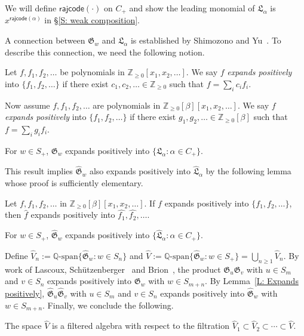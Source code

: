 \documentclass[ALCO]{cedram}
\newcommand{\fG}{\mathfrak{G}}
\newcommand{\fGb}{\fG}
\newcommand{\fL}{\mathfrak{L}}
\newcommand{\fLb}{\fL}
\newcommand{\topLas}{\widehat{\fL}}
\newcommand{\topGro}{\widehat{\fG}}
\newcommand{\Q}{\mathbb{Q}}
\newcommand{\rajcode}{\mathsf{rajcode}}
\newcommand{\definition}[1]{{\color{darkred}\emph{#1}}}
\begin{document}
We will define $\rajcode(\cdot)$ on $C_+$
and show the leading monomial of $\fLb_\alpha$ is $x^{\rajcode(\alpha)}$
in \S\ref{S: weak composition}.

A connection between $\fGb_w$ and $\fLb_\alpha$
is established by Shimozono and Yu~\cite{SY}.
To describe this connection, 
we need the following notion.
\begin{defn}
Let $f, f_1, f_2, \dots$ be polynomials in 
$\mathbb{Z}_{\geq 0}[x_1, x_2,\dots]$.
We say $f$ \definition{expands positively} 
into $\{f_1,f_2, \dots\}$ if there exist 
$c_1,c_2, \dots \in \mathbb{Z}_{\geq 0}$
such that $f = \sum_{i} c_if_i$.

Now assume $f, f_1, f_2, \dots$ are polynomials 
in $\mathbb{Z}_{ \geq 0}[\beta][x_1, x_2,\dots]$.
We say $f$ \definition{expands positively} 
into $\{f_1,f_2, \dots\}$ if there exist 
$g_1,g_2, \dots \in \mathbb{Z}_{\geq 0}[\beta]$ 
such that $f = \sum_{i} g_if_i$.
\end{defn}

\begin{ourthm}[\cite{SY}]
\label{T: Gro to Las}
For $w \in S_+$, $\fGb_w$ expands positively
into $\{\fLb_\alpha: \alpha \in C_+\}$. 
\end{ourthm}
 
This result implies
$\topGro_w$ also expands
positively into
$\topLas_\alpha$ by the following lemma whose proof
is sufficiently elementary. 

\begin{lemma}
\label{L: Expands positively}
Let $f, f_1, f_2, \dots$ 
in $\mathbb{Z}_{\geq 0}[\beta][x_1, x_2,\dots]$.
If $f$ expands positively 
into $\{f_1, f_2, \dots\}$,
then $\widehat{f}$ expands positively into $\widehat{f_1}, \widehat{f_2}, \dots $.
\end{lemma}

\begin{cor}
\label{C: top Gro to top Las}
For $w \in S_+$,
$\topGro_w$ expands positively into $\{\topLas_\alpha: \alpha \in C_+\}$.
\end{cor}

Define $\widehat{V}_n :=  \Q\textrm{-span}\{\topGro_w: w \in S_n\}$ and $\widehat{V} :=  \Q\textrm{-span}\{\topGro_w: w \in S_+\} = \bigcup_{n \geq 1} \widehat{V}_n$.
By work of Lascoux, Sch{\"u}tzenberger~\cite{LS:Groth} and Brion~\cite{Bri},
the product $\fGb_u \fGb_v$ with $u \in S_m$ and $v \in S_n$
expands positively into $\fGb_w$ with $w \in S_{m + n}$.
By Lemma~\ref{L: Expands positively},
$\topGro_u \topGro_v$ with $u \in S_m$ and $v \in S_n$ expands positively into $\topGro_w$ 
with $w \in S_{m + n}$.
Finally, we conclude the following.
\begin{prop}
\label{P: Filtered Algebra}
The space $\widehat{V}$ is a filtered 
algebra with respect to the filtration
$\widehat{V}_1 \subset \widehat{V}_2 \subset \cdots \subset \widehat{V}$.
\end{prop}
\end{document}
